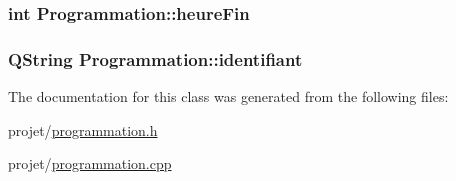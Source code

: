 \subsubsection[{heure\+Fin}]{\setlength{\rightskip}{0pt plus 5cm}int Programmation\+::heure\+Fin\hspace{0.3cm}{\ttfamily [protected]}}\label{class_programmation_a6a807cdfb835c2440834ea04e1ef9d40}
\hypertarget{class_programmation_aea36cbc16a71cead5fed20ce8b7670fc}{}
\subsubsection[{identifiant}]{\setlength{\rightskip}{0pt plus 5cm}Q\+String Programmation\+::identifiant\hspace{0.3cm}{\ttfamily [protected]}}\label{class_programmation_aea36cbc16a71cead5fed20ce8b7670fc}


The documentation for this class was generated from the following files\+:\begin{DoxyCompactItemize}
\item 
projet/\hyperlink{programmation_8h}{programmation.\+h}\item 
projet/\hyperlink{programmation_8cpp}{programmation.\+cpp}\end{DoxyCompactItemize}
